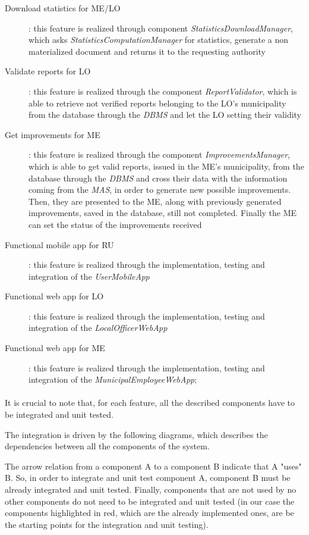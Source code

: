 \begin{description}
				\item [Download statistics for ME/LO]: this feature is realized through component \textit{StatisticsDownloadManager}, which asks \textit{StatisticsComputationManager} for statistics, generate a non materialized document and returns it to the requesting authority
				\item [Validate reports for LO]: this feature is realized through the component \textit{ReportValidator}, which is able to retrieve not verified reports belonging to the LO's municipality from the database through the \textit{DBMS} and let the LO setting their validity
				\item [Get improvements for ME]: this feature is realized through the component \textit{ImprovementsManager}, which is able to get valid reports, issued in the ME's municipality, from the database through the \textit{DBMS} and cross their data with the information coming from the \textit{MAS}, in order to generate new possible improvements. Then, they are presented to the ME, along with previously generated improvements, saved in the database, still not completed. Finally the ME can set the status of the improvements received
				\item [Functional mobile app for RU]: this feature is realized through the implementation, testing and integration of the \textit{UserMobileApp}
				\item [Functional web app for LO]: this feature is realized through the implementation, testing and integration of the \textit{LocalOfficerWebApp}
				\item [Functional web app for ME]: this feature is realized through the implementation, testing and integration of the \textit{MunicipalEmployeeWebApp};
			\end{description}
		\paragraph{}
			It is crucial to note that, for each feature, all the described components have to be integrated and unit tested. 
			
			The integration is driven by the following diagrams, which describes the dependencies between all the components of the system. 
			
			The arrow relation from a component A to a component B indicate that A "uses" B. So, in order to integrate and unit test component A, component B must be already integrated and unit tested. Finally, components that are not used by no other components do not need to be integrated and unit tested (in our case the components highlighted in red, which are the already implemented ones, are be the starting points for the integration and unit testing).
			
			